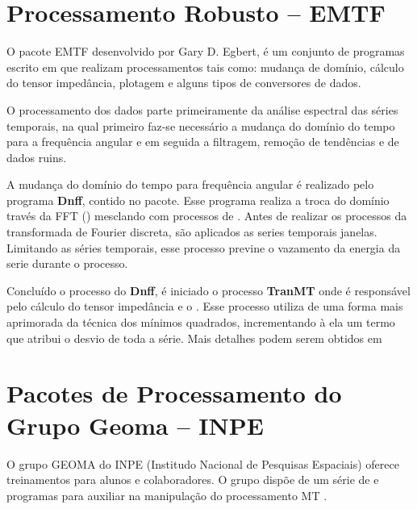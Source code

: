     \section{Processamento Robusto -- EMTF}
        \label{sec-robusto}
            
            
            O pacote EMTF \cite{egbert-emtf} desenvolvido por Gary D. Egbert, é um conjunto de programas escrito em  que realizam processamentos tais como: mudança de domínio, cálculo do tensor impedância, plotagem e alguns tipos de conversores de dados. 
            
            O processamento dos dados parte primeiramente da análise espectral das séries temporais, na qual primeiro faz-se necessário a mudança do domínio do tempo para a frequência angular e em seguida a filtragem, remoção de tendências e de dados ruins.
            
            A mudança do domínio do tempo para frequência angular é realizado pelo programa \textbf{Dnff}, contido no pacote. Esse programa realiza a troca do domínio través da FFT () mesclando com processos de  . Antes de realizar os processos da transformada de Fourier discreta, são aplicados as series temporais janelas. Limitando as séries temporais, esse processo previne o vazamento da energia da serie durante o processo.
            
            Concluído o processo do \textbf{Dnff}, é iniciado o processo \textbf{TranMT} onde é responsável pelo cálculo do tensor impedância e o . Esse processo utiliza de uma forma mais aprimorada da técnica dos mínimos quadrados, incrementando à ela um termo que atribui o desvio de toda a série. Mais detalhes podem serem obtidos em \cite{robusto-egbert}
            
           
    \section{Pacotes de Processamento do Grupo Geoma -- INPE}
    
        O grupo GEOMA do INPE (Institudo Nacional de Pesquisas Espaciais) oferece treinamentos para alunos e colaboradores. O grupo dispõe de um série de  e programas para auxiliar na manipulação do processamento MT \cite{geomadge}.

